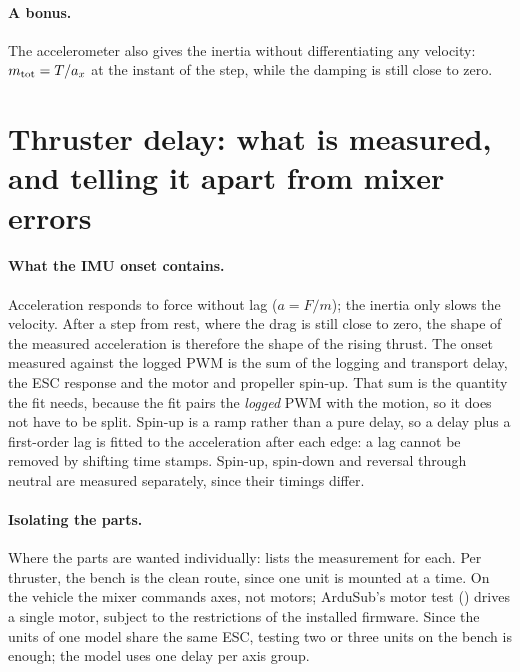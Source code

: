 \paragraph{A bonus.} The accelerometer also gives the inertia without differentiating any velocity:
$m_\mathrm{tot} = T/a_x$ at the instant of the step, while the damping is still close to zero.

\section{Thruster delay: what is measured, and telling it apart from mixer errors}
\label{sec:thruster-delay}

\begin{revised}[title=Added 30 October 2026,breakable]
\paragraph{What the IMU onset contains.} Acceleration responds to force without lag
($a = F/m$); the inertia only slows the velocity. After a step from rest, where the drag is still
close to zero, the shape of the measured acceleration is therefore the shape of the rising
thrust. The onset measured against the logged PWM is the sum of the logging and transport delay,
the ESC response and the motor and propeller spin-up. That sum is the quantity the fit needs,
because the fit pairs the \emph{logged} PWM with the motion, so it does not have to be split.
Spin-up is a ramp rather than a pure delay, so a delay plus a first-order lag is fitted to the
acceleration after each edge: a lag cannot be removed by shifting time stamps. Spin-up,
spin-down and reversal through neutral are measured separately, since their timings differ.

\paragraph{Isolating the parts.} Where the parts are wanted individually:
 lists the measurement for each. Per thruster, the bench is the clean
route, since one unit is mounted at a time. On the vehicle the mixer commands axes, not motors;
ArduSub's motor test () drives a single motor, subject to the
restrictions of the installed firmware. Since the units of one model share the same ESC, testing
two or three units on the bench is enough; the model uses one delay per axis group.


\end{revised}
